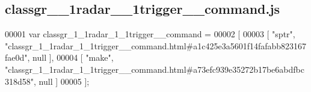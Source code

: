 \subsection{classgr\+\_\+\_\+1radar\+\_\+\_\+1trigger\+\_\+\+\_\+command.\+js}
\label{classgr__1__1radar__1__1trigger____command_8js_source}

\begin{DoxyCode}
00001 var classgr_1_1radar_1_1trigger__command =
00002 [
00003     [ \textcolor{stringliteral}{"sptr"}, \textcolor{stringliteral}{"classgr\_1\_1radar\_1\_1trigger\_\_command.html#a1c425e3a5601f14fafabb823167fae0d"}, null ],
00004     [ \textcolor{stringliteral}{"make"}, \textcolor{stringliteral}{"classgr\_1\_1radar\_1\_1trigger\_\_command.html#a73efc939e35272b17be6abdfbc318d58"}, null ]
00005 ];
\end{DoxyCode}
